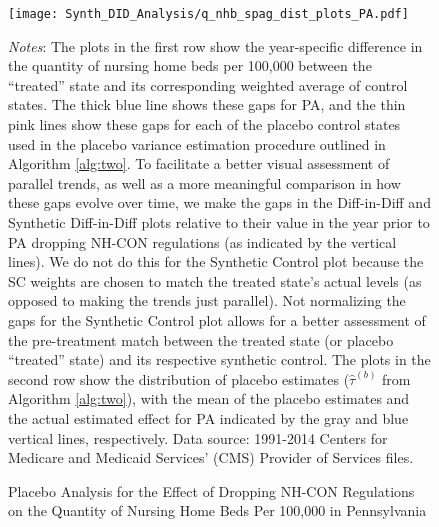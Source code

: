 \documentclass[../Main.tex]{subfiles}
\begin{document}
\newpage
\begin{figure}[t]
	\begin{center}
	\caption{\label{fig: q_nhb_spag_plots_pa} \centering Placebo Analysis for the Effect of Dropping NH-CON Regulations on the Quantity of Nursing Home Beds Per 100,000 in Pennsylvania}
    \texttt{[image: Synth\_DID\_Analysis/q\_nhb\_spag\_dist\_plots\_PA.pdf]}
    \end{center}
    \footnotesize
		\textit{Notes}: The plots in the first row show the year-specific difference in the quantity of nursing home beds per 100,000 between the ``treated'' state and its corresponding weighted average of control states. The thick blue line shows these gaps for PA, and the thin pink lines show these gaps for each of the placebo control states used in the placebo variance estimation procedure outlined in Algorithm \ref{alg:two}. To facilitate a better visual assessment of parallel trends, as well as a more meaningful comparison in how these gaps evolve over time, we make the gaps in the Diff-in-Diff and Synthetic Diff-in-Diff plots relative to their value in the year prior to PA dropping NH-CON regulations (as indicated by the vertical lines). We do not do this for the Synthetic Control plot because the SC weights are chosen to match the treated state's actual levels (as opposed to making the trends just parallel). Not normalizing the gaps for the Synthetic Control plot allows for a better assessment of the pre-treatment match between the treated state (or placebo ``treated'' state) and its respective synthetic control. The plots in the second row show the distribution of placebo estimates ($\hat{\tau}^{(b)}$ from Algorithm \ref{alg:two}), with the mean of the placebo estimates and the actual estimated effect for PA indicated by the gray and blue vertical lines, respectively. Data source: 1991-2014 Centers for Medicare and Medicaid Services’ (CMS) Provider of Services files.
\end{figure}
\clearpage
\end{document}
